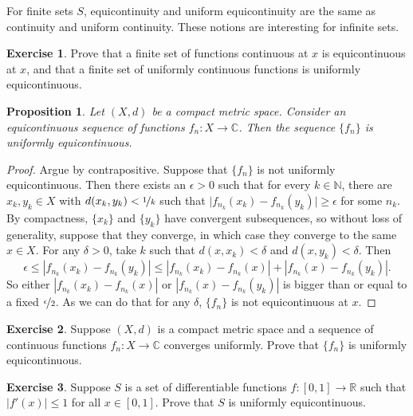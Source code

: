 \documentclass[12pt,openany]{book}
\newcommand{\sabs}[1]{\lvert {#1} \rvert}
\newcommand{\abs}[1]{\left\lvert {#1} \right\rvert}
\newcommand{\C}{{\mathbb{C}}}
\newcommand{\R}{{\mathbb{R}}}
\newcommand{\N}{{\mathbb{N}}}
\theoremstyle{plain}
\newtheorem{prop}[thm]{Proposition}
\theoremstyle{remark}
\theoremstyle{definition}
\newenvironment{exbox}{%
    \def\FrameCommand{\vrule width 1pt \relax\hspace{10pt}}%
    \MakeFramed{\advance\hsize-\width\FrameRestore}%
}{%
    \endMakeFramed
}
\theoremstyle{exercise}
\newtheorem{exercise}{Exercise}[section]
\theoremstyle{example}
\begin{document}
For finite sets $S$, equicontinuity and uniform equicontinuity
are the same as continuity and uniform continuity.
These notions are interesting for infinite sets.

\begin{exbox}
\begin{exercise}
Prove that a finite set of functions continuous at $x$ is
equicontinuous at $x$, and that
a finite set of uniformly continuous functions is uniformly equicontinuous.
\end{exercise}
\end{exbox}

\begin{prop}
Let $(X,d)$ be a compact metric space.
Consider an
equicontinuous sequence of functions
$f_n \colon X \to \C$.
Then the sequence $\{ f_n \}$ is uniformly equicontinuous.
\end{prop}

\begin{proof}
Argue by contrapositive.  Suppose that $\{ f_n \}$ is not
uniformly equicontinuous.  Then there exists an $\epsilon > 0$
such that for every $k \in \N$, there
are $x_k,y_k \in X$ with $d(x_k,y_k) < \nicefrac{1}{k}$
such that $\sabs{f_{n_k}(x_k)-f_{n_k}(y_k)} \geq \epsilon$ for some $n_k$.
By compactness, $\{x_k\}$ and $\{ y_k\}$ have convergent subsequences, so
without loss of generality, suppose that they converge, in which case
they converge to the same $x \in X$.
For any $\delta > 0$, take $k$ such that
$d(x,x_k) < \delta$ and
$d(x,y_k) < \delta$.
Then
\begin{equation*}
\epsilon \leq 
\abs{f_{n_k}(x_k)-f_{n_k}(y_k)}
\leq
\abs{f_{n_k}(x_k)-f_{n_k}(x)} + \abs{f_{n_k}(x)-f_{n_k}(y_k)} .
\end{equation*}
So either 
$\abs{f_{n_k}(x_k)-f_{n_k}(x)}$ or $\abs{f_{n_k}(x)-f_{n_k}(y_k)}$ is
bigger than or equal to a fixed $\nicefrac{\epsilon}{2}$.
As we can do that for any $\delta$,
$\{ f_n \}$ is not equicontinuous at $x$.
\end{proof}

\begin{exbox}
\begin{exercise}
Suppose $(X,d)$ is a compact metric space
and a sequence of continuous functions $f_n \colon X \to \C$
converges uniformly. Prove that $\{ f_n \}$ is uniformly equicontinuous.
\end{exercise}

\begin{exercise}
Suppose $S$ is a set of differentiable functions $f \colon [0,1] \to \R$
such that $\sabs{f'(x)} \leq 1$ for all $x \in [0,1]$.
Prove that $S$ is uniformly equicontinuous.
\end{exercise}
\end{exbox}
\end{document}
